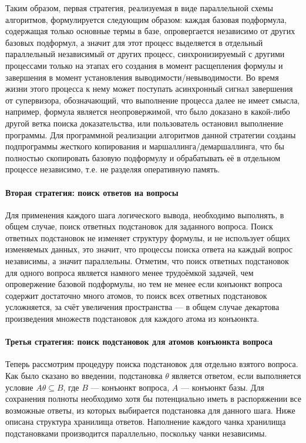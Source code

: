 Таким образом, первая стратегия, реализуемая в виде параллельной схемы алгоритмов, формулируется следующим образом: каждая базовая подформула, содержащая только основные термы в базе, опровергается независимо от других базовых подформул, а значит для этот процесс выделяется в отдельный параллельный независимый от других процесс, синхронизируемый с другими процессами только  на этапах его создания в момент расщепления формулы и завершения в момент установления выводимости/невыводимости. Во время жизни этого процесса к нему может поступать асинхронный сигнал завершения от супервизора, обозначающий, что выполнение процесса далее не имеет смысла, например, формула является неопровержимой, что было доказано в какой-либо другой ветка поиска доказательства, или пользователь остановил выполнение программы. Для программной реализации алгоритмов данной стратегии созданы подпрограммы жесткого копирования и маршаллинга/демаршаллинга, что бы полностью скопировать базовую подформулу и обрабатывать её в отдельном процессе независимо, т.е. не разделяя оперативную память.


\paragraph{Вторая стратегия: поиск ответов на вопросы}
Для применения каждого шага логического вывода, необходимо выполнять, в общем случае, поиск ответных подстановок для заданного вопроса. Поиск ответных подстановок не изменяет структуру формулы, и не использует общих изменяемых данных, это значит, что процессы поиска ответа на каждый вопрос независимы, а значит параллельны. Отметим, что поиск ответных подстановок для одного вопроса является намного менее трудоёмкой задачей, чем опровержение базовой подформулы, но тем не менее если конъюнкт вопроса содержит достаточно много атомов, то поиск всех ответных подстановок усложняется, за счёт увеличения пространства --- в общем случае декартова произведения множеств подстановок для каждого атома из конъюнкта.



\paragraph{Третья стратегия: поиск подстановок для атомов конъюнкта вопроса}
Теперь рассмотрим процедуру поиска подстановок для отдельно взятого вопроса. Как было сказано во введении, подстановка $\theta$ является ответом, если выполняется условие $A\theta \subseteq B$, где $B$ --- конъюнкт вопроса, $A$ --- конъюнкт базы. Для сохранения полноты необходимо хотя бы потенциально иметь в распоряжении все возможные ответы, из которых выбирается подстановка для данного шага. Ниже описана структура хранилища ответов. Наполнение каждого чанка хранилища подстановками производится параллельно, поскольку чанки независимы.

